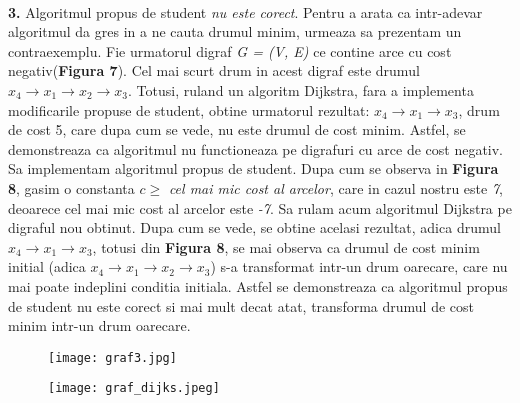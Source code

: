 \documentclass{article}
\begin{document}
\\
  \par\textbf{3.} Algoritmul propus de student \textit{nu este corect}. Pentru a arata ca intr-adevar algoritmul da gres in a ne cauta drumul minim, urmeaza sa prezentam un contraexemplu. Fie urmatorul digraf \textit{G = (V, E)} ce contine arce cu cost negativ(\textbf{Figura 7}). Cel mai scurt drum in acest digraf este drumul $x_4\to x_1 \to x_2 \to x_3$. Totusi, ruland un algoritm Dijkstra, fara a implementa modificarile propuse de student, obtine urmatorul rezultat: $x_4 \to x_1 \to x_3$, drum de cost 5, care dupa cum se vede, nu este drumul de cost minim. Astfel, se demonstreaza
  ca algoritmul nu functioneaza pe digrafuri cu arce de cost negativ. Sa implementam algoritmul propus de student. Dupa cum se observa in \textbf{Figura 8}, gasim o constanta $c \geq$ \textit{cel mai mic cost al arcelor}, care in cazul nostru este \textit{7}, deoarece cel mai mic cost al arcelor este \textit{-7}. 
  Sa rulam acum algoritmul Dijkstra pe digraful nou obtinut. Dupa cum se vede, se obtine acelasi rezultat, adica drumul $x_4 \to x_1 \to x_3$, totusi din \textbf{Figura 8}, se mai observa ca drumul de cost minim initial (adica $x_4\to x_1 \to x_2 \to x_3$) s-a transformat intr-un drum oarecare, care nu mai poate indeplini conditia initiala. Astfel se demonstreaza ca algoritmul propus de student nu este corect si mai mult decat atat, transforma drumul de cost minim intr-un drum oarecare.

\begin{frame}{}
 \begin{figure}[ht]
 \centering
   \begin{minipage}[b]{0.30\linewidth}
           
         
            \caption{}
           
           \texttt{[image: graf3.jpg]}
           
        \end{minipage}
        \hspace{0.3cm}
  \begin{minipage}[b]{0.30\linewidth}
           
         
            \caption{}
           
           \texttt{[image: graf\_dijks.jpeg]}
           
        \end{minipage}
\end{figure}
\end{frame}
\\
\end{document}
